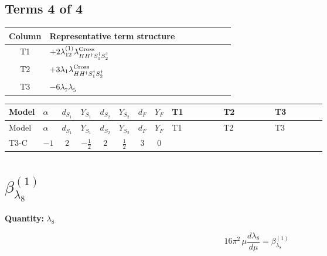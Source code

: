 \documentclass[8pt]{article}
\begin{document}
\begin{landscape}
\subsection*{Terms 4 of 4}
\begin{center}
\begin{tabular}{@{}c >{\raggedright\arraybackslash}p{0.82\linewidth}@{}}
\toprule
Column & Representative term structure \\
\midrule
T1 & \(\displaystyle +2 {\lambda_{12}^{(1)}} {\lambda_{H H^\dagger S_1^\dagger S_2^\dagger}^{\rm Cross}}\) \\
\midrule
T2 & \(\displaystyle +3 {\lambda_1} {\lambda_{H H^\dagger S_1^\dagger S_2^\dagger}^{\rm Cross}}\) \\
\midrule
T3 & \(\displaystyle -6 {\lambda_{7}} {\lambda_5}\) \\
\midrule
\bottomrule
\end{tabular}
\end{center}
\smallskip
\tiny
\begin{longtable}{@{}llcccccc >{\raggedright\arraybackslash}p{0.21\linewidth} >{\raggedright\arraybackslash}p{0.21\linewidth} >{\raggedright\arraybackslash}p{0.21\linewidth}@{}}
\toprule
Model & $\alpha$ & $d_{S_1}$ & $Y_{S_1}$ & $d_{S_2}$ & $Y_{S_2}$ & $d_F$ & $Y_F$ & T1 & T2 & T3 \\
\midrule
\endfirsthead
\toprule
Model & $\alpha$ & $d_{S_1}$ & $Y_{S_1}$ & $d_{S_2}$ & $Y_{S_2}$ & $d_F$ & $Y_F$ & T1 & T2 & T3 \\
\midrule
\endhead
T3-C & $-1$ & $2$ & $-\frac{1}{2}$ & $2$ & $\frac{1}{2}$ & $3$ & $0$ & \scriptsize\adjustbox{max width=\linewidth}{$\begin{gathered} +2 {\lambda_{12}^{(1)}} {\lambda_{H H^\dagger S_1^\dagger S_2^\dagger}^{\rm Cross}}\end{gathered}$} & \scriptsize\adjustbox{max width=\linewidth}{$\begin{gathered} +3 {\lambda_1} {\lambda_{H H^\dagger S_1^\dagger S_2^\dagger}^{\rm Cross}}\end{gathered}$} & \scriptsize\adjustbox{max width=\linewidth}{$\begin{gathered} -6 {\lambda_{7}} {\lambda_5}\end{gathered}$} \\
\midrule
\bottomrule
\end{longtable}
\clearpage
\section*{$\beta_{\lambda_{8}}^{(1)}$}
\noindent\textbf{Quantity: }$\lambda_{8}$\par\smallskip
\[16\pi^2\,\mu\frac{d \lambda_{8}}{d\mu}=\beta_{\lambda_{8}}^{(1)}\]

\end{landscape}
\end{document}
